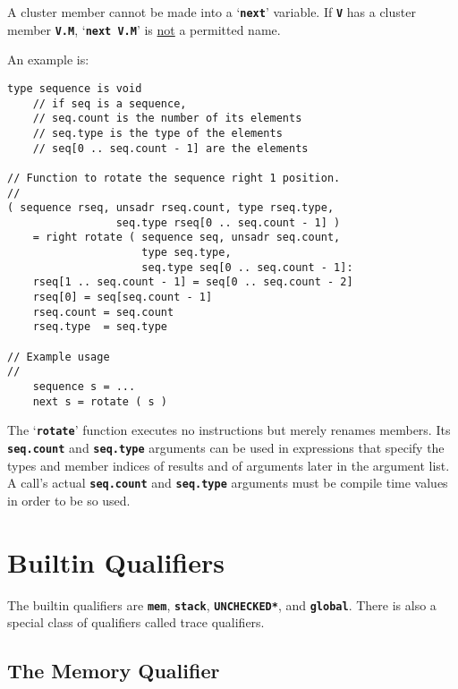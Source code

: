 \documentclass[12pt]{article}
\newcommand{\TT}[1]{{\tt \bfseries #1}}
\newenvironment{indpar}[1][0.3in]%
	{\begin{list}{}%
		     {\setlength{\itemsep}{0in}%
		      \setlength{\topsep}{0in}%
		      \setlength{\parsep}{1ex}%
		      \setlength{\labelwidth}{#1}%
		      \setlength{\leftmargin}{#1}%
		      \addtolength{\leftmargin}{\labelsep}}%
	 \item}%
	{\end{list}}
\begin{document}
A cluster member cannot be made into a `\TT{next}' variable.
If \TT{V} has a cluster member \TT{V.M}, `\TT{next V.M}' is \underline{not}
a permitted name.

An example is:
\begin{indpar}\begin{verbatim}
type sequence is void
    // if seq is a sequence,
    // seq.count is the number of its elements
    // seq.type is the type of the elements
    // seq[0 .. seq.count - 1] are the elements

// Function to rotate the sequence right 1 position.
//
( sequence rseq, unsadr rseq.count, type rseq.type,
                 seq.type rseq[0 .. seq.count - 1] )
    = right rotate ( sequence seq, unsadr seq.count,
                     type seq.type,
                     seq.type seq[0 .. seq.count - 1]:
    rseq[1 .. seq.count - 1] = seq[0 .. seq.count - 2]
    rseq[0] = seq[seq.count - 1]
    rseq.count = seq.count
    rseq.type  = seq.type

// Example usage
//
    sequence s = ...
    next s = rotate ( s )
\end{verbatim}\end{indpar}
The `\TT{rotate}' function executes no instructions but merely
renames members.  Its \TT{seq.count} and \TT{seq.type} arguments
can be used in expressions that specify the types and member indices
of results and of arguments later in the argument list.  A call's actual
\TT{seq.count} and \TT{seq.type} arguments must be compile time values
in order to be so used.

\section{Builtin Qualifiers}
\label{BUILTIN-QUALIFIERS}

The builtin qualifiers are \TT{mem}, \TT{stack}, \TT{*UNCHECKED*},
and \TT{global}.
There is also a special class of qualifiers called trace qualifiers.

\subsection{The Memory Qualifier}
\label{THE-MEM-QUALIFIER}
\end{document}
